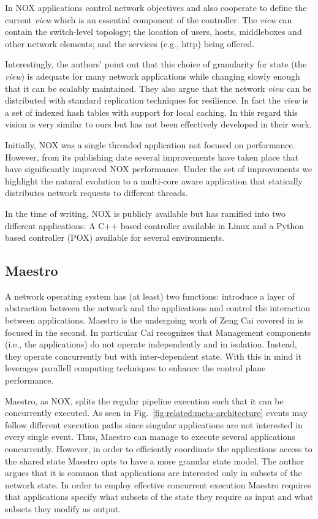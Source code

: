 In NOX applications control network objectives and also cooperate to define the current \emph{view} which is an essential component of the controller. 
The \emph{view} can contain the switch-level topology; the location of users, hosts, middleboxes and other network elements; and the services (e.g., \gls{http}) being offered. 

Interestingly, the authors' point out that this choice of granularity for state (the \emph{view}) is adequate for many network applications while changing slowly enough that it can be scalably  maintained. 
They also argue that the network \emph{view} can be distributed with standard replication techniques for resilience. 
In fact the \emph{view} is a set of indexed hash tables with support for local caching. 
In this regard this vision is very similar to ours but has not been effectively developed in their work. 

Initially, NOX was a single threaded application not focused on performance. 
However, from its publishing date several improvements have taken place \cite{Tootoonchian:2012uia,zen-doc-thesis} that have significantly improved NOX performance. 
Under the set of improvements we highlight the natural evolution to a multi-core aware application that statically distributes network requests to different threads. 

In the time of writing, NOX is publicly available but has ramified into two different applications: A C++ based controller available in Linux and a Python based controller (POX) available for several environments.

\subsection{Maestro}
\label{sec:related:maestro}


A network operating system has (at least) two functions: introduce a layer of abstraction between the network and the applications and control the interaction between applications. Maestro is the undergoing work of Zeng Cai covered in \cite{maestro} is focused in the second. In particular Cai recognizes that Management components (i.e., the applications)  do not operate independently and in isolation. Instead, they operate
concurrently but with inter-dependent state. 
With this in mind it leverages parallell computing techniques to enhance the control plane performance. 

Maestro, as NOX, splits the regular pipeline execution such that it can be concurrently executed. As seen in Fig.~\ref{fig:related:meta-architecture} events may
follow different execution paths since singular applications are not interested in every single event. 
Thus, Maestro can manage to execute several applications concurrently. However, in order to
efficiently coordinate the applications access to the shared state Maestro opts to have a more granular state model. 
The author argues that it is
common that applications are interested only in subsets of the network state. 
In order to employ effective concurrent execution Maestro requires that applications specify  what subsets of the state they require as input and what subsets they modify as output. 

